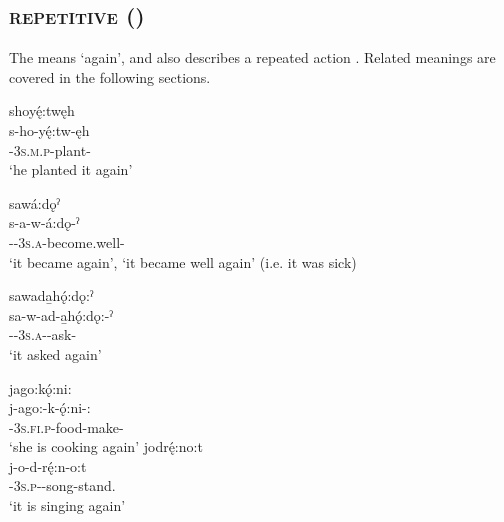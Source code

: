 \subsection{ \textsc{repetitive} ({\repetitive})} \label{[s-, j-, ji-] (repetitive)}
The  {\repetitive} means ‘again’, and also describes a repeated action . Related meanings are covered in the following sections. 

\ea\label{ex:srepex}

\ea shoyę́:twęh\\
\gll s-ho-yę́:tw-ęh\\
{\repetitive}-\textsc{3s.m.p}-plant-{\stative}\\
\glt `he planted it again'

\ex sawá:dǫˀ\\
\gll s-a-w-á:dǫ-ˀ\\
{\repetitive}-{\factual}-\textsc{3s.a}-become.well-{\punctual}\\
\glt `it became again’, ‘it became well again' (i.e. it was sick)


\ex sawada̱hǫ́:dǫ:ˀ\\
\gll sa-w-ad-a̱hǫ́:dǫ:-ˀ\\
{\repetitive}-{\factual}-\textsc{3s.a}-{\semireflexive}-ask-{\punctual}\\
\glt `it asked again'

\ex jago:kǫ́:ni:\\
\gll j-ago:-k-ǫ́:ni-:\\
{\repetitive}-\textsc{3s.fi.p}-food-make-{\stative}\\
\glt `she is cooking again'
\ex jodrę́:no:t\\
\gll j-o-d-rę́:n-o:t\\
\textsc{\repetitive-3s.p}-{\semireflexive}-song-stand.{\stative}\\
\glt  ‘it is singing again' 

